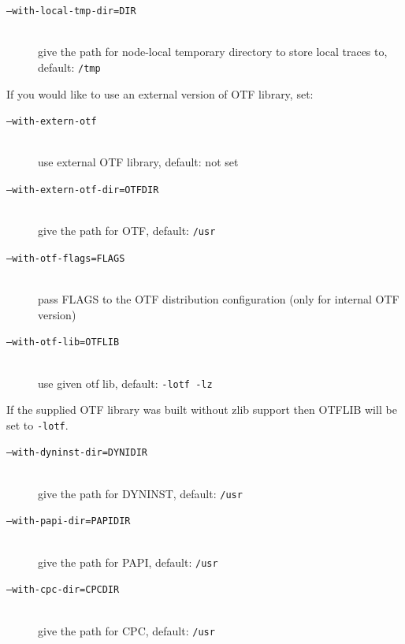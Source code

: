 \documentclass[a4paper,twoside,12pt,BCOR12mm]{scrbook}
\begin{document}
\begin{latexonly}
\begin{description}
\item[\texttt{--with-local-tmp-dir=DIR}] ~\\
                              give the path for node-local temporary directory 
                              to store local traces to, default: \texttt{/tmp}
\end{description}

\noindent If you would like to use an external version of OTF library, set:
\begin{description}
\item[\texttt{--with-extern-otf}] ~\\
                              use external OTF library, default: not set
\item[\texttt{--with-extern-otf-dir=OTFDIR}] ~\\
                              give the path for OTF, default: \texttt{/usr}

\item[\texttt{--with-otf-flags=FLAGS}] ~\\
                              pass FLAGS to the OTF distribution configuration
                              (only for internal OTF version)

\item[\texttt{--with-otf-lib=OTFLIB}] ~\\   
                              use given otf lib, default: \texttt{-lotf -lz}

\end{description}

\noindent If the supplied OTF library was built without zlib support then OTFLIB will
be set to \texttt{-lotf}.

\begin{description}
\item[\texttt{--with-dyninst-dir=DYNIDIR}] ~\\
                              give the path for DYNINST, default: \texttt{/usr}

\item[\texttt{--with-papi-dir=PAPIDIR}] ~\\
                              give the path for PAPI, default: \texttt{/usr}

\item[\texttt{--with-cpc-dir=CPCDIR}] ~\\
                              give the path for CPC, default: \texttt{/usr}

\end{description}


\end{latexonly}
\end{document}
